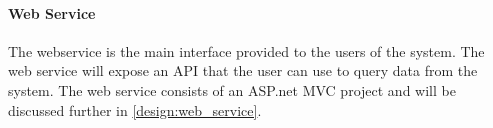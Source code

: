 \paragraph{Web Service}
The webservice is the main interface provided to the users of the system.
The web service will expose an API that the user can use to query data from the system.
The web service consists of an ASP.net MVC project and will be discussed further in \cref{design:web_service}.





